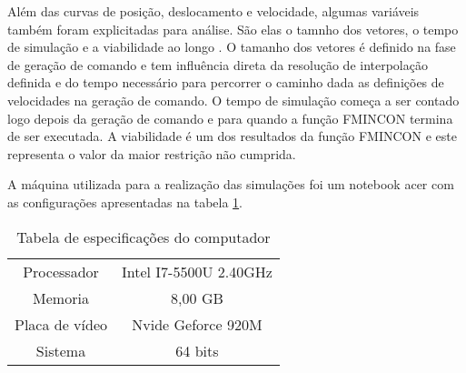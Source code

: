 Além das curvas de posição, deslocamento e velocidade, algumas variáveis também foram explicitadas para análise.
São elas o tamnho dos vetores, o tempo de simulação e a viabilidade ao longo .
O tamanho dos vetores é definido na fase de geração de comando e tem influência direta da resolução de interpolação definida e
do tempo necessário para percorrer o caminho dada as definições de velocidades na geração de comando.
O tempo de simulação começa a ser contado logo depois da geração de comando e para quando a função FMINCON
termina de ser executada.
A viabilidade é um dos resultados da função FMINCON e este representa o valor da maior restrição não cumprida.

A máquina utilizada para a realização das simulações foi um notebook acer com as configurações apresentadas na tabela
\ref{tab:note_config}.

\begin{table}
    \begin{center}
    \caption{Tabela de especificações do computador}
    \label{tab:note_config}
    \begin{tabular}{c c}
        \hline
        Processador & Intel I7-5500U 2.40GHz \\
        Memoria & 8,00 GB \\
        Placa de vídeo & Nvide Geforce 920M \\
        Sistema & 64 bits \\ \hline
    \end{tabular}
    \end{center}
\end{table}
